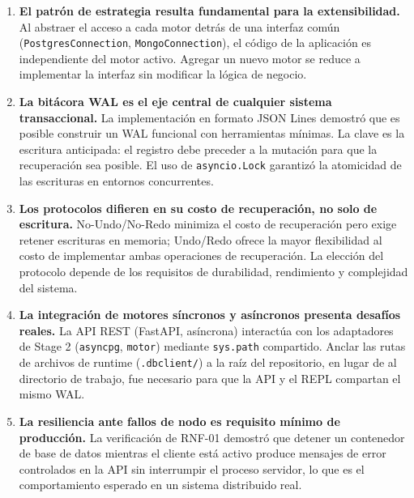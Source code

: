 \documentclass[12pt,letterpaper]{article}
\begin{document}
\begin{enumerate}
  \item \textbf{El patrón de estrategia resulta fundamental para la extensibilidad.}
        Al abstraer el acceso a cada motor detrás de una interfaz común (\texttt{PostgresConnection},
        \texttt{MongoConnection}), el código de la aplicación es independiente del motor activo.
        Agregar un nuevo motor se reduce a implementar la interfaz sin modificar la lógica de negocio.

  \item \textbf{La bitácora WAL es el eje central de cualquier sistema transaccional.}
        La implementación en formato JSON Lines demostró que es posible construir un WAL
        funcional con herramientas mínimas. La clave es la escritura anticipada: el registro
        debe preceder a la mutación para que la recuperación sea posible. El uso de
        \texttt{asyncio.Lock} garantizó la atomicidad de las escrituras en entornos concurrentes.

  \item \textbf{Los protocolos difieren en su costo de recuperación, no solo de escritura.}
        No-Undo/No-Redo minimiza el costo de recuperación pero exige retener escrituras en
        memoria; Undo/Redo ofrece la mayor flexibilidad al costo de implementar ambas
        operaciones de recuperación. La elección del protocolo depende de los requisitos de
        durabilidad, rendimiento y complejidad del sistema.

  \item \textbf{La integración de motores síncronos y asíncronos presenta desafíos reales.}
        La API REST (FastAPI, asíncrona) interactúa con los adaptadores de Stage 2
        (\texttt{asyncpg}, \texttt{motor}) mediante \texttt{sys.path} compartido.
        Anclar las rutas de archivos de runtime (\texttt{.dbclient/}) a la raíz del repositorio,
        en lugar de al directorio de trabajo, fue necesario para que la API y el REPL
        compartan el mismo WAL.

  \item \textbf{La resiliencia ante fallos de nodo es requisito mínimo de producción.}
        La verificación de RNF-01 demostró que detener un contenedor de base de datos mientras
        el cliente está activo produce mensajes de error controlados en la API sin interrumpir
        el proceso servidor, lo que es el comportamiento esperado en un sistema distribuido real.
\end{enumerate}
\end{document}
